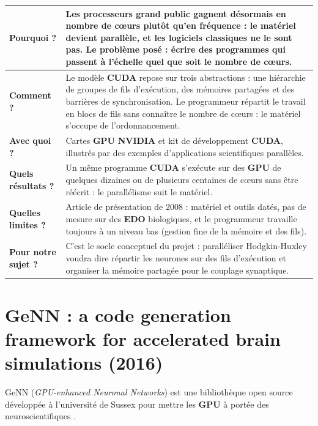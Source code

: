 \documentclass{report}
\begin{document}
\medskip
\begin{tabular}{|p{3.2cm}|p{11.2cm}|}
\hline
\textbf{Pourquoi ?} & Les processeurs grand public gagnent désormais en nombre de cœurs plutôt qu'en fréquence : le matériel devient parallèle, et les logiciels classiques ne le sont pas. Le problème posé : écrire des programmes qui passent à l'échelle quel que soit le nombre de cœurs. \\ \hline
\textbf{Comment ?} & Le modèle \textbf{CUDA} repose sur trois abstractions : une hiérarchie de groupes de fils d'exécution, des mémoires partagées et des barrières de synchronisation. Le programmeur répartit le travail en blocs de fils sans connaître le nombre de cœurs : le matériel s'occupe de l'ordonnancement. \\ \hline
\textbf{Avec quoi ?} & Cartes \textbf{GPU} \textbf{NVIDIA} et kit de développement \textbf{CUDA}, illustrés par des exemples d'applications scientifiques parallèles. \\ \hline
\textbf{Quels résultats ?} & Un même programme \textbf{CUDA} s'exécute sur des \textbf{GPU} de quelques dizaines ou de plusieurs centaines de cœurs sans être réécrit : le parallélisme suit le matériel. \\ \hline
\textbf{Quelles limites ?} & Article de présentation de 2008 : matériel et outils datés, pas de mesure sur des \textbf{EDO} biologiques, et le programmeur travaille toujours à un niveau bas (gestion fine de la mémoire et des fils). \\ \hline
\textbf{Pour notre sujet ?} & C'est le socle conceptuel du projet : paralléliser Hodgkin-Huxley voudra dire répartir les neurones sur des fils d'exécution et organiser la mémoire partagée pour le couplage synaptique. \\ \hline
\end{tabular}

\newpage

\section{GeNN : a code generation framework for accelerated brain simulations (2016)}

GeNN (\emph{GPU-enhanced Neuronal Networks}) est une bibliothèque open source développée à l'université de Sussex pour mettre les \textbf{GPU} à portée des neuroscientifiques \cite{yavuz2016}.
\end{document}
